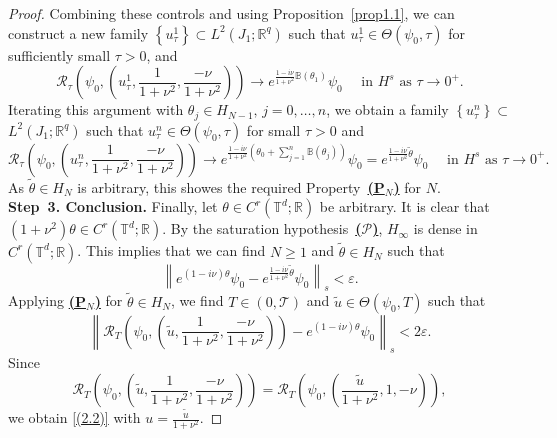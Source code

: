 \documentclass[review]{elsarticle}
\theoremstyle{dotless}
\def \geq{\geqslant}
\numberwithin{equation}{section}
\begin{document}
\begin{proof}
Combining these controls and using Proposition~\ref{prop1.1}, we can construct a new family $\left\{u_\tau^1\right\} \subset L^2\left(J_1 ; \mathbb{R}^q\right)$ such that $u_\tau^1 \in \Theta\left(\psi_0, \tau\right)$ for sufficiently small $\tau>0$, and
$$
\mathcal{R}_\tau\left(\psi_0, \left(u_\tau^1,\frac{1}{1+\nu^2},\frac{-\nu}{1+\nu^2}\right)\right) \rightarrow e^{\frac{1-i\nu}{1+\nu^2} \mathbb{B} (\theta_1 )} \psi_0 \quad \text { in } H^s \text { as } \tau \rightarrow 0^{+} .
$$
Iterating this argument with $\theta_j \in H_{N-1},\, j=0, \ldots, n$, we obtain a family $\left\{u_\tau^n\right\} \subset$ $L^2\left(J_1 ; \mathbb{R}^q\right)$ such that $u_\tau^n \in \Theta\left(\psi_0, \tau\right)$ for small $\tau>0$ and
$$
\mathcal{R}_\tau\left(\psi_0, \left(u_\tau^n,\frac{1}{1+\nu^2},\frac{-\nu}{1+\nu^2}\right)\right) \rightarrow e^{\frac{1-i\nu}{1+\nu^2}\left(\theta_0+\sum_{j=1}^n \mathbb{B} (\theta_j )\right)} \psi_0=e^{\frac{1-i\nu}{1+\nu^2} \tilde{\theta}} \psi_0 \quad \text { in } H^s \text { as } \tau \rightarrow 0^{+} .
$$
As $\tilde{\theta} \in H_N$ is arbitrary, this showes the required Property~\hyperlink{PN}{\textbf{(P$_{N}$)}} for $N$.
\\
\textbf{Step~3. Conclusion.}  Finally, let $\theta \in C^r\left(\mathbb{T}^d ; \mathbb{R}\right)$ be arbitrary. It is clear that $ (1+\nu^2)\theta\in C^r\left(\mathbb{T}^d ; \mathbb{R}\right) $. By the saturation hypothesis~{\hyperlink{H1}{\textbf{($\mathscr{P}$)}}}, $H_{\infty}$ is dense in $C^r\left(\mathbb{T}^d ; \mathbb{R}\right)$. This implies that we can find $N \geq 1$ and $\tilde{\theta} \in H_N$ such that
$$
\left\|e^{(1-i\nu)\theta} \psi_0-e^{\frac{1-i\nu}{1+\nu^2} \tilde{\theta}} \psi_0\right\|_s<\varepsilon.
$$
Applying \hyperlink{PN}{\textbf{(P$_{N}$)}}  for $\tilde{\theta} \in H_N$, we find $T \in(0, \mathcal{T})$ and $\tilde{u} \in \Theta\left(\psi_0, T\right)$ such that \begin{equation*}
	\left\|\mathcal{R}_T\left(\psi_0, \left(\tilde{u},\frac{1}{1+\nu^2},\frac{-\nu}{1+\nu^2}\right)\right)-e^{(1-i\nu) \theta} \psi_0\right\|_s<2\varepsilon.
\end{equation*}
Since
\begin{equation*}
\mathcal{R}_T\left(\psi_0, \left(\tilde{u},\frac{1}{1+\nu^2},\frac{-\nu}{1+\nu^2}\right)\right) = \mathcal{R}_T\left(\psi_0, \left(\frac{\tilde{u}}{1+\nu^2},1,-\nu\right)\right),
\end{equation*}
we obtain \eqref{(2.2)} with $ u= \frac{\tilde{u}}{1+\nu^2} $.


\end{proof}
\end{document}
